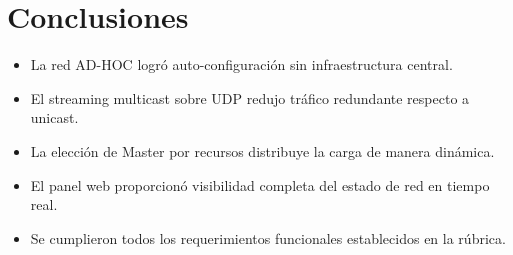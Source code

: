 \chapter{Conclusiones}

\begin{itemize}
    \item La red AD-HOC logró auto-configuración sin infraestructura central.
    \item El streaming multicast sobre UDP redujo tráfico redundante respecto a unicast.
    \item La elección de Master por recursos distribuye la carga de manera dinámica.
    \item El panel web proporcionó visibilidad completa del estado de red en tiempo real.
    \item Se cumplieron todos los requerimientos funcionales establecidos en la rúbrica.
\end{itemize}
